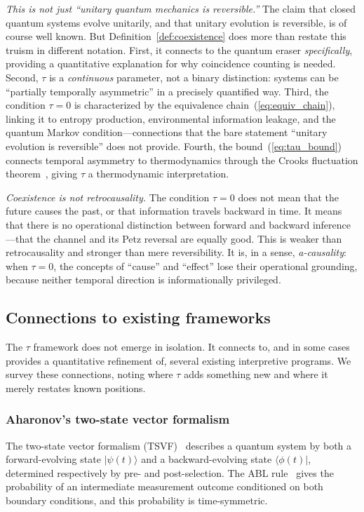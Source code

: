 \documentclass[12pt]{article}
\theoremstyle{definition}
\theoremstyle{remark}
\newcommand{\ket}[1]{|#1\rangle}
\newcommand{\bra}[1]{\langle#1|}
\newcommand{\tauasym}{\tau}
\begin{document}
\emph{This is not just ``unitary quantum mechanics is
reversible.''}
The claim that closed quantum systems evolve unitarily, and
that unitary evolution is reversible, is of course well known.
But Definition~\ref{def:coexistence} does more than restate
this truism in different notation.  First, it connects to the
quantum eraser \emph{specifically}, providing a quantitative
explanation for why coincidence counting is needed.
Second, $\tauasym$ is a \emph{continuous} parameter, not a
binary distinction: systems can be ``partially temporally
asymmetric'' in a precisely quantified way.
Third, the condition $\tauasym = 0$ is characterized by the
equivalence chain~(\ref{eq:equiv_chain}), linking it to
entropy production, environmental information leakage, and the
quantum Markov condition---connections that the bare statement
``unitary evolution is reversible'' does not provide.
Fourth, the bound~(\ref{eq:tau_bound}) connects temporal
asymmetry to thermodynamics through the Crooks fluctuation
theorem~\cite{Crooks1999}, giving $\tauasym$ a
thermodynamic interpretation.

\emph{Coexistence is not retrocausality.}
The condition $\tauasym = 0$ does not mean that the future
causes the past, or that information travels backward in time.
It means that there is no operational distinction between
forward and backward inference---that the channel and its Petz
reversal are equally good.  This is weaker than retrocausality
and stronger than mere reversibility.  It is, in a sense,
\emph{a-causality}: when $\tauasym = 0$, the concepts of
``cause'' and ``effect'' lose their operational grounding, because
neither temporal direction is informationally privileged.

\subsection{Connections to existing frameworks}

The $\tauasym$ framework does not emerge in isolation.  It
connects to, and in some cases provides a quantitative refinement
of, several existing interpretive programs.  We survey these
connections, noting where $\tauasym$ adds something new and where
it merely restates known positions.

\subsubsection{Aharonov's two-state vector formalism}

The two-state vector formalism (TSVF)~\cite{ABL1964,Aharonov1990}
describes a quantum system by both a forward-evolving state
$\ket{\psi(t)}$ and a backward-evolving state $\bra{\phi(t)}$,
determined respectively by pre- and post-selection.
The ABL rule~\cite{ABL1964} gives the probability of an
intermediate measurement outcome conditioned on both boundary
conditions, and this probability is time-symmetric.
\end{document}
